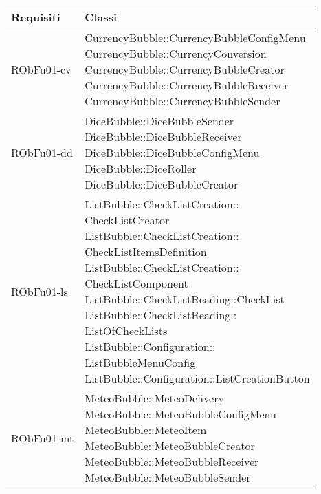 \begin{center}
\begin{longtable}{|
*{1}{>{\centering\arraybackslash}m{2.5cm}|}
*{1}{>{\centering\arraybackslash}m{7.5cm}|}}
\hline \textbf{Requisiti} & \textbf{Classi}\\
\hline \endhead
\hline \endfoot

RObFu01-cv & \makecell[l]{CurrencyBubble::CurrencyBubbleConfigMenu
\\CurrencyBubble::CurrencyConversion
\\CurrencyBubble::CurrencyBubbleCreator
\\CurrencyBubble::CurrencyBubbleReceiver
\\CurrencyBubble::CurrencyBubbleSender
\\}\\\hline
RObFu01-dd & \makecell[l]{DiceBubble::DiceBubbleSender
\\DiceBubble::DiceBubbleReceiver
\\DiceBubble::DiceBubbleConfigMenu
\\DiceBubble::DiceRoller
\\DiceBubble::DiceBubbleCreator
\\}\\\hline
RObFu01-ls & \makecell[l]{ListBubble::CheckListCreation:: \\ \hfill CheckListCreator
\\ListBubble::CheckListCreation:: \\ \hfill CheckListItemsDefinition
\\ListBubble::CheckListCreation:: \\ \hfill CheckListComponent
\\ListBubble::CheckListReading::CheckList
\\ListBubble::CheckListReading:: \\ \hfill ListOfCheckLists
\\ListBubble::Configuration:: \\ \hfill ListBubbleMenuConfig
\\ListBubble::Configuration::ListCreationButton
\\}\\\hline
RObFu01-mt & \makecell[l]{MeteoBubble::MeteoDelivery
\\MeteoBubble::MeteoBubbleConfigMenu
\\MeteoBubble::MeteoItem
\\MeteoBubble::MeteoBubbleCreator
\\MeteoBubble::MeteoBubbleReceiver
\\MeteoBubble::MeteoBubbleSender
}
\end{longtable}
\end{center}
